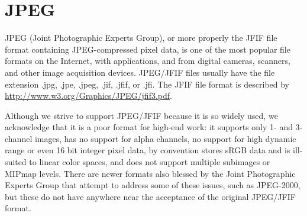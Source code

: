 

\vspace{.25in}

\section{JPEG}
\label{sec:bundledplugins:jpeg}

JPEG (Joint Photographic Experts Group), or more properly the JFIF file
format containing JPEG-compressed pixel data, is one of the most popular
file formats on the Internet, with applications, and from digital
cameras, scanners, and other image acquisition devices.  JPEG/JFIF files
usually have the file extension {\cf .jpg}, {\cf .jpe}, {\cf .jpeg},
{\cf .jif}, {\cf .jfif}, or {\cf .jfi}.  The JFIF file format is
described by \url{http://www.w3.org/Graphics/JPEG/jfif3.pdf}.

Although we strive to support JPEG/JFIF because it is so widely used, we
acknowledge that it is a poor format for high-end work: it supports only
1- and 3-channel images, has no support for alpha channels, no support
for high dynamic range or even 16 bit integer pixel data, by convention
stores sRGB data and is ill-suited to linear color spaces, and does not
support multiple subimages or MIPmap levels.  There are newer formats
also blessed by the Joint Photographic Experts Group that attempt to
address some of these issues, such as JPEG-2000, but these do not have
anywhere near the acceptance of the original JPEG/JFIF format.

\vspace{.125in}

